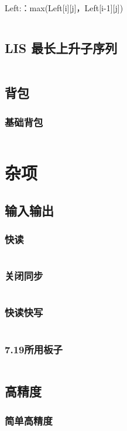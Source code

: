 \documentclass[a4paper,11pt]{article}
\begin{document}
Left:：max(Left[i][j]，Left[i-1][j])
\inputminted[breaklines,linenos,frame=leftline]{c++}{DP/StretchedWire.cpp}

\subsection{LIS 最长上升子序列}
\inputminted[breaklines,linenos,frame=leftline]{c++}{DP/lis.cpp}

\subsection{背包}
\subsubsection{基础背包}
\inputminted[breaklines,linenos,frame=leftline]{c++}{DP/pack.cpp}

\newpage
\section{杂项}
\subsection{输入输出}
\subsubsection{快读}
\inputminted[breaklines,linenos,frame=leftline]{c++}{others/read1.cpp}
\subsubsection{关闭同步}
\inputminted[breaklines,linenos,frame=leftline]{c++}{others/read2.cpp}
\subsubsection{快读快写}
\inputminted[breaklines,linenos,frame=leftline]{c++}{others/read3.cpp}
\subsubsection{7.19所用板子}
\inputminted[breaklines,linenos,frame=leftline]{c++}{others/7.19.cpp}
\subsection{高精度}
\subsubsection{简单高精度}
\inputminted[breaklines,linenos,frame=leftline]{c++}{others/bignum2.cpp}
\end{document}

